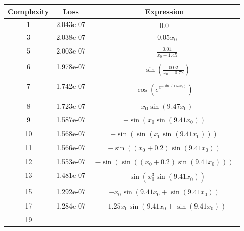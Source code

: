 \begin{center}
        \begin{tabular}{|c|c|c|}
        \hline
        Complexity & Loss & Expression \\
        \hline
        1 & 2.043e-07 & $\begin{aligned}0.0\end{aligned}$\\ \hline3 & 2.038e-07 & $\begin{aligned}- 0.05 x_{0}\end{aligned}$\\ \hline5 & 2.003e-07 & $\begin{aligned}- \frac{0.01}{x_{0} + 1.45}\end{aligned}$\\ \hline6 & 1.978e-07 & $\begin{aligned}- \sin{\left(\frac{0.02}{x_{0} - 0.72} \right)}\end{aligned}$\\ \hline7 & 1.742e-07 & $\begin{aligned}\cos{\left(e^{e^{- \sin{\left(1.54 x_{0} \right)}}} \right)}\end{aligned}$\\ \hline8 & 1.723e-07 & $\begin{aligned}- x_{0} \sin{\left(9.47 x_{0} \right)}\end{aligned}$\\ \hline9 & 1.587e-07 & $\begin{aligned}- \sin{\left(x_{0} \sin{\left(9.41 x_{0} \right)} \right)}\end{aligned}$\\ \hline10 & 1.568e-07 & $\begin{aligned}- \sin{\left(\sin{\left(x_{0} \sin{\left(9.41 x_{0} \right)} \right)} \right)}\end{aligned}$\\ \hline11 & 1.566e-07 & $\begin{aligned}- \sin{\left(\left(x_{0} + 0.2\right) \sin{\left(9.41 x_{0} \right)} \right)}\end{aligned}$\\ \hline12 & 1.553e-07 & $\begin{aligned}- \sin{\left(\sin{\left(\left(x_{0} + 0.2\right) \sin{\left(9.41 x_{0} \right)} \right)} \right)}\end{aligned}$\\ \hline13 & 1.481e-07 & $\begin{aligned}- \sin{\left(x_{0}^{3} \sin{\left(9.41 x_{0} \right)} \right)}\end{aligned}$\\ \hline15 & 1.292e-07 & $\begin{aligned}- x_{0} \sin{\left(9.41 x_{0} + \sin{\left(9.41 x_{0} \right)} \right)}\end{aligned}$\\ \hline17 & 1.284e-07 & $\begin{aligned}- 1.25 x_{0} \sin{\left(9.41 x_{0} + \sin{\left(9.41 x_{0} \right)} \right)}\end{aligned}$\\ \hline19 & 
\end{tabular}
\end{center}
